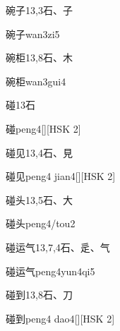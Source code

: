 \begin{Entry}{碗子}{13,3}{⽯、⼦}
  \begin{Phonetics}{碗子}{wan3zi5}
  \end{Phonetics}
\end{Entry}

\begin{Entry}{碗柜}{13,8}{⽯、⽊}
  \begin{Phonetics}{碗柜}{wan3gui4}
  \end{Phonetics}
\end{Entry}

\begin{Entry}{碰}{13}{⽯}
  \begin{Phonetics}{碰}{peng4}[][HSK 2]
  \end{Phonetics}
\end{Entry}

\begin{Entry}{碰见}{13,4}{⽯、⾒}
  \begin{Phonetics}{碰见}{peng4 jian4}[][HSK 2]
  \end{Phonetics}
\end{Entry}

\begin{Entry}{碰头}{13,5}{⽯、⼤}
  \begin{Phonetics}{碰头}{peng4/tou2}
  \end{Phonetics}
\end{Entry}

\begin{Entry}{碰运气}{13,7,4}{⽯、⾡、⽓}
  \begin{Phonetics}{碰运气}{peng4yun4qi5}
  \end{Phonetics}
\end{Entry}

\begin{Entry}{碰到}{13,8}{⽯、⼑}
  \begin{Phonetics}{碰到}{peng4 dao4}[][HSK 2]
  \end{Phonetics}
\end{Entry}

